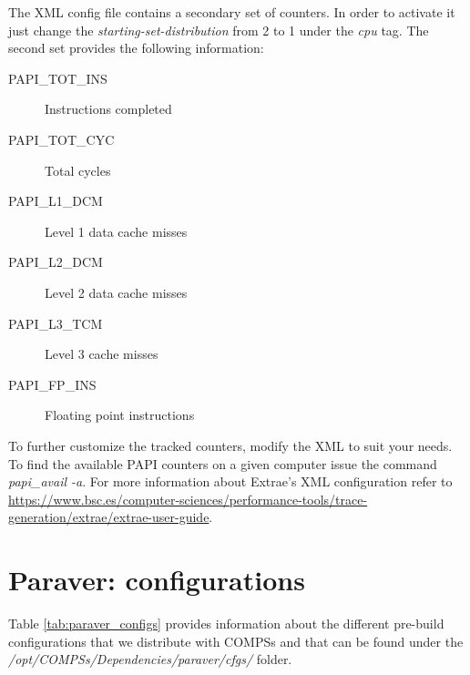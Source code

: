 The XML config file contains a secondary set of counters. In order to activate it just change the \textit{starting-set-distribution} from 2 to 1 under the \textit{cpu} tag. The second set provides the following information:

\begin{description}
 \item [PAPI\_TOT\_INS] Instructions completed
 \item [PAPI\_TOT\_CYC] Total cycles
 \item [PAPI\_L1\_DCM] Level 1 data cache misses
 \item [PAPI\_L2\_DCM] Level 2 data cache misses
 \item [PAPI\_L3\_TCM] Level 3 cache misses
 \item [PAPI\_FP\_INS] Floating point instructions
\end{description}


To further customize the tracked counters, modify the XML to suit your needs. To find the available PAPI counters on a given computer issue the command \textit{papi\_avail -a}. For more information about Extrae's XML configuration refer to \url{https://www.bsc.es/computer-sciences/performance-tools/trace-generation/extrae/extrae-user-guide}.



\section{Paraver: configurations}
\label{sec:configs}

Table \ref{tab:paraver_configs} provides information about the different pre-build configurations that we distribute
with COMPSs and that can be found under the \textit{/opt/COMPSs/Dependencies/paraver/cfgs/} folder.


